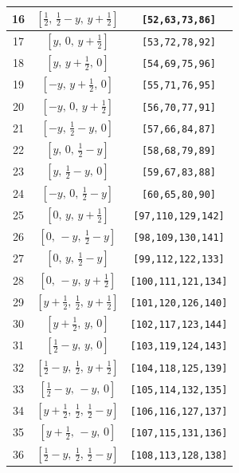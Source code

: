 \documentclass[fleqn,8pt]{jsarticle}
\begin{document}
\begin{longtable}{ccc}
16 & $\left[ \frac{1}{2},\, \frac{1}{2} - y,\, y + \frac{1}{2} \right]$ & {\tt [52,63,73,86]} \\ \hline
17 & $\left[ y,\, 0,\, y + \frac{1}{2} \right]$ & {\tt [53,72,78,92]} \\ \hline
18 & $\left[ y,\, y + \frac{1}{2},\, 0 \right]$ & {\tt [54,69,75,96]} \\ \hline
19 & $\left[ - y,\, y + \frac{1}{2},\, 0 \right]$ & {\tt [55,71,76,95]} \\ \hline
20 & $\left[ - y,\, 0,\, y + \frac{1}{2} \right]$ & {\tt [56,70,77,91]} \\ \hline
21 & $\left[ - y,\, \frac{1}{2} - y,\, 0 \right]$ & {\tt [57,66,84,87]} \\ \hline
22 & $\left[ y,\, 0,\, \frac{1}{2} - y \right]$ & {\tt [58,68,79,89]} \\ \hline
23 & $\left[ y,\, \frac{1}{2} - y,\, 0 \right]$ & {\tt [59,67,83,88]} \\ \hline
24 & $\left[ - y,\, 0,\, \frac{1}{2} - y \right]$ & {\tt [60,65,80,90]} \\ \hline
25 & $\left[ 0,\, y,\, y + \frac{1}{2} \right]$ & {\tt [97,110,129,142]} \\ \hline
26 & $\left[ 0,\, - y,\, \frac{1}{2} - y \right]$ & {\tt [98,109,130,141]} \\ \hline
27 & $\left[ 0,\, y,\, \frac{1}{2} - y \right]$ & {\tt [99,112,122,133]} \\ \hline
28 & $\left[ 0,\, - y,\, y + \frac{1}{2} \right]$ & {\tt [100,111,121,134]} \\ \hline
29 & $\left[ y + \frac{1}{2},\, \frac{1}{2},\, y + \frac{1}{2} \right]$ & {\tt [101,120,126,140]} \\ \hline
30 & $\left[ y + \frac{1}{2},\, y,\, 0 \right]$ & {\tt [102,117,123,144]} \\ \hline
31 & $\left[ \frac{1}{2} - y,\, y,\, 0 \right]$ & {\tt [103,119,124,143]} \\ \hline
32 & $\left[ \frac{1}{2} - y,\, \frac{1}{2},\, y + \frac{1}{2} \right]$ & {\tt [104,118,125,139]} \\ \hline
33 & $\left[ \frac{1}{2} - y,\, - y,\, 0 \right]$ & {\tt [105,114,132,135]} \\ \hline
34 & $\left[ y + \frac{1}{2},\, \frac{1}{2},\, \frac{1}{2} - y \right]$ & {\tt [106,116,127,137]} \\ \hline
35 & $\left[ y + \frac{1}{2},\, - y,\, 0 \right]$ & {\tt [107,115,131,136]} \\ \hline
36 & $\left[ \frac{1}{2} - y,\, \frac{1}{2},\, \frac{1}{2} - y \right]$ & {\tt [108,113,128,138]} \\ \hline

\end{longtable}
\end{document}
